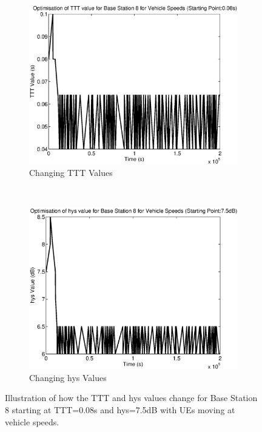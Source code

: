 \begin{figure}[H]
        \centering
        \begin{subfigure}[b]{0.49\textwidth}
                \includegraphics[width=\textwidth]{figures/graphs/vehhighhys/TTT8.eps}
                \caption{Changing TTT Values}
        \end{subfigure}%
        ~ %
        \begin{subfigure}[b]{0.49\textwidth}
                \includegraphics[width=\textwidth]{figures/graphs/vehhighhys/hys8.eps}
                \caption{Changing hys Values}
        \end{subfigure}
        \caption{Illustration of how the TTT and hys values change for Base Station 8 starting at TTT=0.08s and hys=7.5dB with UEs moving at vehicle speeds.}
\end{figure}